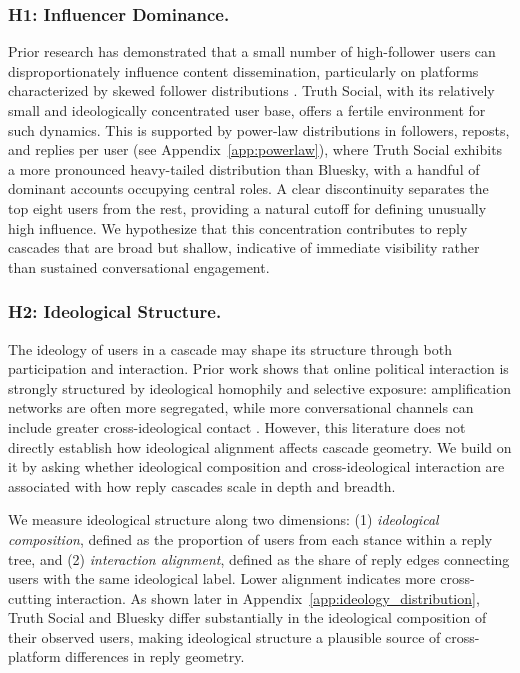 \documentclass[letterpaper]{article} %
\begin{document}
\subsubsection{H1: Influencer Dominance.}
Prior research has demonstrated that a small number of high-follower users can disproportionately influence content dissemination, particularly on platforms characterized by skewed follower distributions \cite{goel_structural_2016, zannettou_what_2018}. Truth Social, with its relatively small and ideologically concentrated user base, offers a fertile environment for such dynamics. This is supported by power-law distributions in followers, reposts, and replies per user (see Appendix~\ref{app:powerlaw}), where Truth Social exhibits a more pronounced heavy-tailed distribution than Bluesky, with a handful of dominant accounts occupying central roles. A clear discontinuity separates the top eight users from the rest, providing a natural cutoff for defining unusually high influence. We hypothesize that this concentration contributes to reply cascades that are broad but shallow, indicative of immediate visibility rather than sustained conversational engagement.

\subsubsection{H2: Ideological Structure.}

The ideology of users in a cascade may shape its structure through both participation and interaction. Prior work shows that online political interaction is strongly structured by ideological homophily and selective exposure: amplification networks are often more segregated, while more conversational channels can include greater cross-ideological contact \cite{conover_political_2011, garimella_political_2018, barbera_tweeting_2015, adamic_political_2005, guess_how_2023}. However, this literature does not directly establish how ideological alignment affects cascade geometry. We build on it by asking whether ideological composition and cross-ideological interaction are associated with how reply cascades scale in depth and breadth.

We measure ideological structure along two dimensions: (1) \textit{ideological composition}, defined as the proportion of users from each stance within a reply tree, and (2) \textit{interaction alignment}, defined as the share of reply edges connecting users with the same ideological label. Lower alignment indicates more cross-cutting interaction. As shown later in Appendix~\ref{app:ideology_distribution}, Truth Social and Bluesky differ substantially in the ideological composition of their observed users, making ideological structure a plausible source of cross-platform differences in reply geometry.
\end{document}
